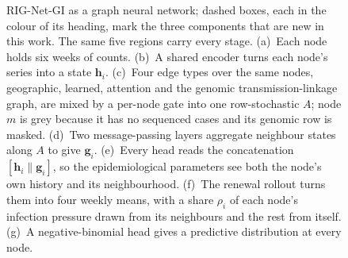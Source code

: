 \begin{figure}[t]
{%
}
\caption{RIG-Net-GI as a graph neural network; dashed boxes, each in the colour of its heading, mark the three components that are new in this work. The same five regions carry every stage. (a)~Each node holds six weeks of counts. (b)~A shared encoder turns each node's series into a state $\mathbf{h}_i$. (c)~Four edge types over the same nodes, geographic, learned, attention and the genomic transmission-linkage graph, are mixed by a per-node gate into one row-stochastic $A$; node $m$ is grey because it has no sequenced cases and its genomic row is masked. (d)~Two message-passing layers aggregate neighbour states along $A$ to give $\mathbf{g}_i$. (e)~Every head reads the concatenation $[\mathbf{h}_i\|\mathbf{g}_i]$, so the epidemiological parameters see both the node's own history and its neighbourhood. (f)~The renewal rollout turns them into four weekly means, with a share $\rho_i$ of each node's infection pressure drawn from its neighbours and the rest from itself. (g)~A negative-binomial head gives a predictive distribution at every node.}
\label{fig:arch}
\end{figure}
